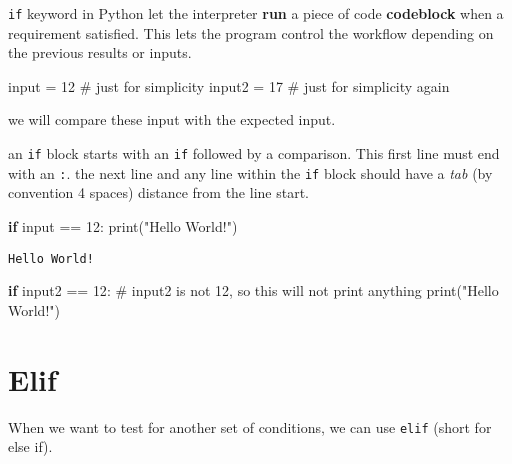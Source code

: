 \documentclass[
  letterpaper,
  DIV=11,
  numbers=noendperiod]{scrreprt}
\newenvironment{Shaded}{\begin{snugshade}}{\end{snugshade}}
\newcommand{\BuiltInTok}[1]{\textcolor[rgb]{0.00,0.23,0.31}{#1}}
\newcommand{\CommentTok}[1]{\textcolor[rgb]{0.37,0.37,0.37}{#1}}
\newcommand{\ControlFlowTok}[1]{\textcolor[rgb]{0.00,0.23,0.31}{\textbf{#1}}}
\newcommand{\DecValTok}[1]{\textcolor[rgb]{0.68,0.00,0.00}{#1}}
\newcommand{\NormalTok}[1]{\textcolor[rgb]{0.00,0.23,0.31}{#1}}
\newcommand{\OperatorTok}[1]{\textcolor[rgb]{0.37,0.37,0.37}{#1}}
\newcommand{\StringTok}[1]{\textcolor[rgb]{0.13,0.47,0.30}{#1}}
\begin{document}
\texttt{if} keyword in Python let the interpreter \textbf{run} a piece
of code \textbf{codeblock} when a requirement satisfied. This lets the
program control the workflow depending on the previous results or
inputs.

\begin{Shaded}
\begin{Highlighting}[]
\BuiltInTok{input} \OperatorTok{=} \DecValTok{12} \CommentTok{\# just for simplicity}
\NormalTok{input2 }\OperatorTok{=} \DecValTok{17} \CommentTok{\# just for simplicity again}
\end{Highlighting}
\end{Shaded}

we will compare these input with the expected input.

an \texttt{if} block starts with an \texttt{if} followed by a
comparison. This first line must end with an \texttt{:}. the next line
and any line within the \texttt{if} block should have a \emph{tab} (by
convention 4 spaces) distance from the line start.

\begin{Shaded}
\begin{Highlighting}[]
\ControlFlowTok{if} \BuiltInTok{input} \OperatorTok{==} \DecValTok{12}\NormalTok{:}
    \BuiltInTok{print}\NormalTok{(}\StringTok{"Hello World!"}\NormalTok{)}
\end{Highlighting}
\end{Shaded}

\begin{verbatim}
Hello World!
\end{verbatim}

\begin{Shaded}
\begin{Highlighting}[]
\ControlFlowTok{if}\NormalTok{ input2 }\OperatorTok{==} \DecValTok{12}\NormalTok{: }\CommentTok{\# input2 is not 12, so this will not print anything}
    \BuiltInTok{print}\NormalTok{(}\StringTok{"Hello World!"}\NormalTok{)}
\end{Highlighting}
\end{Shaded}

\section{Elif}\label{elif}

When we want to test for another set of conditions, we can use
\texttt{elif} (short for else if).
\end{document}
